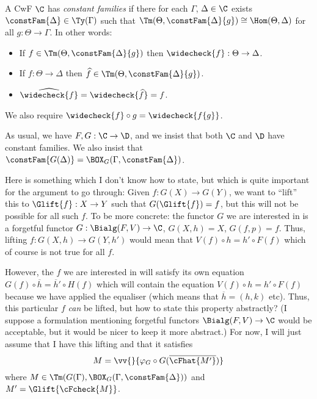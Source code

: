 \documentclass{article}
\begin{document}
\begin{definition}
  A CwF $\C$ has \emph{constant families} if there for each $\Gamma$,
  $\Delta \in \C$ exists $\constFam{\Delta} \in \Ty(\Gamma)$ such that
  $\Tm(\Theta, \constFam{\Delta}\{g\}) \cong \Hom(\Theta, \Delta)$ for
  all $g : \Theta \to \Gamma$. In other words:
  \begin{itemize}
  \item If $f \in \Tm(\Theta, \constFam{\Delta}\{g\})$ then $\widecheck{f} : \Theta \to \Delta$.
  \item If $f : \Theta \to \Delta$ then $\widehat{f} \in \Tm(\Theta, \constFam{\Delta}\{g\})$.
  \item $\widehat{\widecheck{f}} = \widecheck{\widehat{f}} = f$.
  \end{itemize}
We also require $\widecheck{f} \circ g = \widecheck{f\{g\}}$.
\end{definition}

As usual, we have $F, G : \C \to \D$, and we insist that both $\C$ and
$\D$ have constant families. We also insist that $\constFam{G(\Delta)}
= \BOX_G(\Gamma, \constFam{\Delta})$.

Here is something which I don't know how to state, but which is quite
important for the argument to go through: Given $f : G(X) \to G(Y)$,
we want to ``lift'' this to $\Glift{f} : X \to Y$ such that
$G(\Glift{f}) = f$, but this will not be possible for all such $f$. To
be more concrete: the functor $G$ we are interested in is a forgetful
functor $G : \Bialg(F, V) \to \C$, $G(X, h) = X$, $G(f, p) = f$. Thus,
lifting $f : G(X, h) \to G(Y, h')$ would mean that $V(f) \circ h = h'
\circ F(f)$ which of course is not true for all $f$.

However, the $f$ we are interested in will satisfy its own equation
$G(f) \circ \overline{h} = \overline{h}' \circ H(f)$ which will
contain the equation $V(f) \circ h = h' \circ F(f)$ because we have
applied the equaliser (which means that $\overline{h} = (h, k)$
etc). Thus, this particular $f$ \emph{can} be lifted, but how to state
this property abstractly? (I suppose a formulation mentioning
forgetful functors $\Bialg(F, V) \to \C$ would be acceptable, but it
would be nicer to keep it more abstract.) For now, I will just assume
that I have this lifting and that it satisfies
\[
M = \vv{}\{\varphi_G \circ G(\overline{\cFhat{M'}})\}
\]
where $M \in \Tm(G(\Gamma), \BOX_G(\Gamma, \constFam{\Delta}))$ and
$M' = \Glift{\cFcheck{M}}$.
\end{document}
